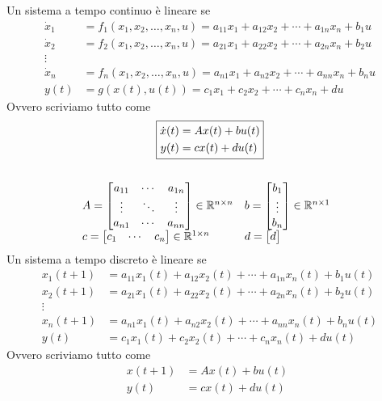 \documentclass[10pt,a4paper]{book}
\begin{document}
Un sistema a tempo continuo è lineare se
\begin{align*}
\dot{x}_{1} & =f_{1}( x_{1} ,x_{2} ,\dotsc ,x_{n} ,u) =a_{11} x_{1} +a_{12} x_{2} +\cdots +a_{1n} x_{n} +b_{1} u\\
\dot{x}_{2} & =f_{2}( x_{1} ,x_{2} ,\dotsc ,x_{n} ,u) =a_{21} x_{1} +a_{22} x_{2} +\cdots +a_{2n} x_{n} +b_{2} u\\
\vdots  & \\
\dot{x}_{n} & =f_{n}( x_{1} ,x_{2} ,\dotsc ,x_{n} ,u) =a_{n1} x_{1} +a_{n2} x_{2} +\cdots +a_{nn} x_{n} +b_{n} u\\
y(t) & =g(x(t),u( t) )=c_{1} x_{1} +c_{2} x_{2} +\cdots +c_{n} x_{n} +du
\end{align*}
Ovvero scriviamo tutto come
\begin{gather*}
\boxed{\begin{aligned}
\dot{x}( t) & =Ax( t) +bu( t)\\
y( t) & =cx( t) +du( t)
\end{aligned}}\\
\\
\begin{array}{ l l }
A=\begin{bmatrix}
a_{11} & \cdots  & a_{1n}\\
\vdots  & \ddots  & \vdots \\
a_{n1} & \cdots  & a_{nn}
\end{bmatrix} \in \mathbb{R}^{n\times n} & b=\begin{bmatrix}
b_{1}\\
\vdots \\
b_{n}
\end{bmatrix} \in \mathbb{R}^{n\times 1}\\
c=\begin{bmatrix}
c_{1} & \cdots  & c_{n}
\end{bmatrix} \in \mathbb{R}^{1\times n} & d=\begin{bmatrix}
d
\end{bmatrix}
\end{array} \ \ 
\end{gather*}
Un sistema a tempo discreto è lineare se
\begin{align*}
x_{1}( t+1) & =a_{11} x_{1}( t) +a_{12} x_{2}( t) +\cdots +a_{1n} x_{n}( t) +b_{1} u( t)\\
x_{2}( t+1) & =a_{21} x_{1}( t) +a_{22} x_{2}( t) +\cdots +a_{2n} x_{n}( t) +b_{2} u( t)\\
\vdots  & \\
x_{n}( t+1) & =a_{n1} x_{1}( t) +a_{n2} x_{2}( t) +\cdots +a_{nn} x_{n}( t) +b_{n} u( t)\\
y(t) & =c_{1} x_{1}( t) +c_{2} x_{2}( t) +\cdots +c_{n} x_{n}( t) +du( t)
\end{align*}
Ovvero scriviamo tutto come
\begin{equation*}
\boxed{\begin{aligned}
x( t+1) & =Ax( t) +bu( t)\\
y( t) & =cx( t) +du( t)
\end{aligned} \ \ }
\end{equation*}
\end{document}
